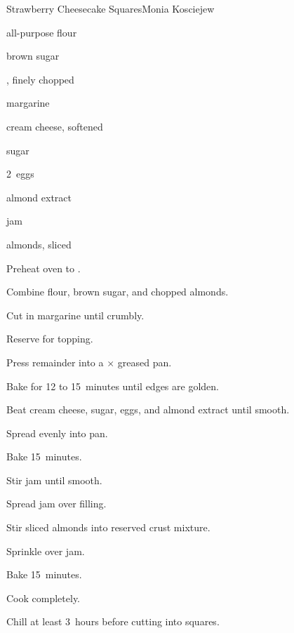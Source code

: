 \begin{recipe}{Strawberry Cheesecake Squares}{Monia Kosciejew}{}

\begin{ingredients}
\item {} all-purpose flour
\item \C{\threequarter} brown sugar
\item \C{\threequarter} , finely chopped
\item \C{\threequarter} margarine
\item {} cream cheese, softened
\item \C{\twothird} sugar
\item 2~eggs
\item \tp{\half} almond extract
\item {}  jam
\item \C{\threequarter} almonds, sliced
\end{ingredients}

\begin{directions}
\item Preheat oven to .
\item Combine flour, brown sugar, and chopped almonds.
\item Cut in margarine until crumbly.
\item Reserve \C{\threequarter} for topping.
\item Press remainder into a $\times$ greased pan.
\item Bake for 12 to 15~minutes until edges are golden.
\item Beat cream cheese, sugar, eggs, and almond extract until smooth.
\item Spread evenly into pan.
\item Bake 15~minutes.
\item Stir jam until smooth.
\item Spread jam over filling.
\item Stir sliced almonds into reserved crust mixture.
\item Sprinkle over jam.
\item Bake 15~minutes.
\item Cook completely.
\item Chill at least 3~hours before cutting into squares.
\end{directions}

\end{recipe}
